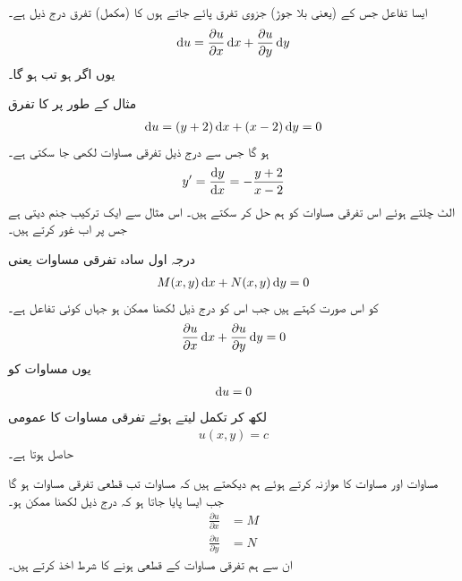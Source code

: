 ایسا تفاعل  جس کے  (یعنی بلا جوڑ) جزوی تفرق پائے جاتے ہوں کا (مکمل) تفرق درج ذیل ہے۔
\begin{align}
\dif u=\frac{\partial u}{\partial x}\dif x+\frac{\partial u}{\partial y}\dif y
\end{align}
یوں اگر  ہو تب  ہو گا۔

مثال کے طور پر  کا تفرق
\begin{align*}
\dif u=(y+2)\dif x+(x-2)\dif y=0
\end{align*}
ہو گا جس سے درج ذیل تفرقی مساوات لکھی جا سکتی ہے۔
\begin{align*}
y'=\frac{\dif y}{\dif x}=-\frac{y+2}{x-2}
\end{align*}
الٹ چلتے ہوئے اس تفرقی مساوات کو ہم حل کر سکتے ہیں۔ اس مثال سے ایک ترکیب جنم دیتی ہے جس پر اب غور کرتے ہیں۔

درجہ اول سادہ تفرقی مساوات  یعنی
\begin{align}\label{مساوات_سادہ_اول_قطعی_الف}
M(x,y)\dif x+N(x,y)\dif y=0
\end{align}
کو اس صورت  کہتے ہیں جب اس کو درج ذیل لکھنا ممکن ہو جہاں  کوئی تفاعل ہے۔
\begin{align}\label{مساوات_سادہ_اول_قطعی_ب}
\frac{\partial u}{\partial x}\dif x+\frac{\partial u}{\partial y}\dif y=0
\end{align}
یوں مساوات  کو
\begin{align}
\dif u=0
\end{align}
لکھ کر تکمل لیتے ہوئے تفرقی مساوات کا عمومی 
\begin{align}
u(x,y)=c
\end{align}
حاصل ہوتا ہے۔

مساوات  اور مساوات  کا موازنہ کرتے ہوئے ہم دیکھتے ہیں کہ مساوات  تب قطعی تفرقی مساوات ہو گا جب ایسا  پایا جاتا ہو کہ درج ذیل لکھنا ممکن ہو۔
\begin{align}
\frac{\partial u}{\partial x}&=M \label{مساوات_سادہ_اول_قطعی_شرط_الف}\\
\frac{\partial u}{\partial y}&=N\label{مساوات_سادہ_اول_قطعی_شرط_ب}
\end{align}
ان سے ہم تفرقی مساوات کے قطعی ہونے کا شرط اخذ کرتے ہیں۔

